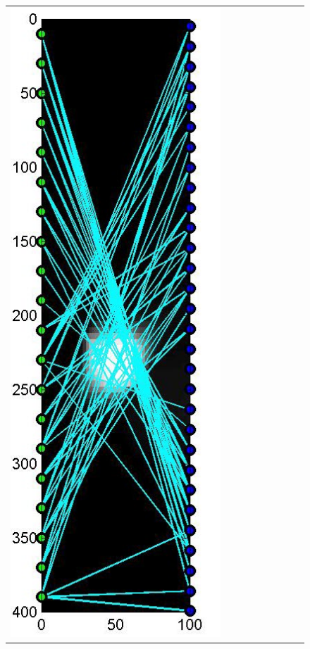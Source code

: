 \documentclass[11pt]{article}
\begin{document}
\begin{figure}[!h]
\begin{center}
\begin{tabular}{|c|c|c|c|c|c|c|c|c|}
			\includegraphics[width=.9\iwidth]{figures/newFigs/noisy/resultsExp-5-designs}
			&

\end{tabular}
\end{center}
\end{figure}
\end{document}
